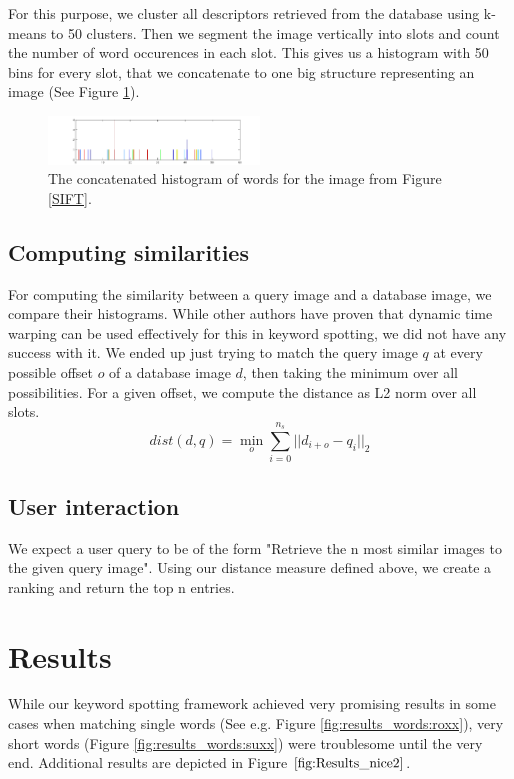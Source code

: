 \documentclass[conference]{IEEEtran}
\begin{document}
For this purpose, we cluster all descriptors retrieved from the database using k-means to
50 clusters. Then we segment the image vertically into slots and count the number of word occurences
in each slot. This gives us a histogram with 50 bins for every slot, that we concatenate to one
big structure representing an image (See Figure \ref{fig:histogram}).
\begin{figure}[!t]
\centering
\includegraphics[width=0.5\textwidth]{kvniginne_histogram}
\caption{The concatenated histogram of words for the image from Figure \ref{SIFT}.}
\label{fig:histogram}
\end{figure}

\subsection{Computing similarities}
\label{sub:similarities}
For computing the similarity between a query image and a database image, 
we compare their histograms. While other authors have proven that dynamic time warping can be
used effectively for this in keyword spotting, we did not have any success with it. We ended
up just trying to match the query image $q$ 
at every possible offset $o$ of a database image $d$, then taking
the minimum over all possibilities.
 For a given offset, we compute the distance as L2 norm over all slots.
\begin{equation}
	dist(d, q) = \min_o \sum_{i = 0}^{n_s} || d_{i + o} - q_{i}  ||_2
\end{equation}


\subsection{User interaction}
\label{sub:user interaction}
We expect a user query to be of the form "Retrieve the n most similar images to the given query
image". Using our distance measure defined above, 
we create a ranking and return the top n entries.

\section{Results}
While our keyword spotting framework achieved very promising results in some cases when matching single words (See e.g. Figure \ref{fig:results_words:roxx}), very short words (Figure \ref{fig:results_words:suxx}) were troublesome until the very end. Additional results are depicted in Figure $\ref{fig:Results_nice2}$.
\end{document}
